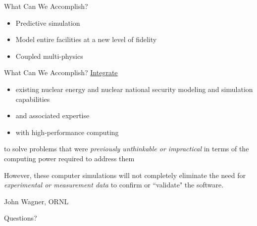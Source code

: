 \documentclass[xcolor=x11names,compress]{beamer}
\renewcommand{\(}{\begin{columns}}
\renewcommand{\)}{\end{columns}}
\newcommand{\<}[1]{\begin{column}{#1}}
\renewcommand{\>}{\end{column}}
\begin{document}
\begin{frame}{What Can We Accomplish?}
\begin{itemize}
\item Predictive simulation 
\item Model entire facilities at a new level of fidelity
\item Coupled multi-physics
\end{itemize}
\begin{figure}
\hfill
\end{figure}
\end{frame}

\begin{frame}{What Can We Accomplish?}
\underline{Integrate}
\begin{itemize}
\item existing nuclear energy and nuclear national security modeling and simulation capabilities
\item and associated expertise
\item with high-performance computing
\end{itemize}    
to solve problems that were \emph{previously unthinkable or impractical} in terms of the computing power required to address them

\vspace*{1em}
However, these computer simulations will not completely eliminate the need for \emph{experimental or measurement data} to confirm or ``validate" the software. 

\vspace*{1em}
\hspace*{0.25 in} John Wagner, ORNL
\end{frame}

%
%

\begin{frame}{Questions?}
\begin{figure}
\end{figure}
\end{frame}
\end{document}
